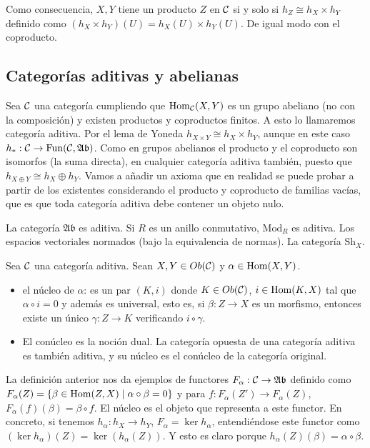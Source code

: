 \documentclass[GA.tex]{subfiles}
\begin{document}
Como consecuencia, $X,Y$ tiene un producto $Z$ en $\mathcal{C}$ si y solo si $h_Z\cong h_X\times h_Y$ definido como $(h_X\times h_Y)(U)=h_X(U)\times h_Y(U)$. De igual modo con el coproducto. 

\subsection{Categorías aditivas y abelianas}
Sea $\mathcal{C}$ una categoría cumpliendo que $\operatorname{Hom}_{\mathcal{C}}(X,Y)$ es un grupo abeliano (no con la composición) y existen productos y coproductos finitos. A esto lo llamaremos categoría aditiva. Por el lema de Yoneda $h_{X\times Y}\cong h_X\times h_Y$, aunque en este caso $h_*:\mathcal{C}\to\mathrm{Fun}(\mathcal{C}, \mathfrak{Ab})$. Como en grupos abelianos el producto y el coproducto son isomorfos (la suma directa), en cualquier categoría aditiva también, puesto que $h_{X\oplus Y}\cong h_X\oplus h_Y$. Vamos a añadir un axioma que en realidad se puede probar a partir de los existentes considerando el producto y coproducto de familias vacías, que es que toda categoría aditiva debe contener un objeto nulo. 

\begin{ej}
La categoría $\mathfrak{Ab}$ es aditiva. Si $R$ es un anillo conmutativo, $\mathrm{Mod}_R$ es aditiva. Los espacios vectoriales normados (bajo la equivalencia de normas). La categoría $\mathrm{Sh}_X$.
\end{ej}

\begin{defi}
Sea $\mathcal{C}$ una categoría aditiva. Sean $X,Y\in Ob(\mathcal{C})$ y $\alpha\in\operatorname{Hom}(X,Y)$.
\begin{itemize}
\item el núcleo de $\alpha$: es un par $(K,i)$ donde $K\in Ob(\mathcal{C})$, $i\in\operatorname{Hom}(K,X)$ tal que $\alpha\circ i=0$ y además es universal, esto es, si $\beta:Z\to X$ es un morfismo, entonces existe un único $\gamma :Z\to K$ verificando $i\circ\gamma$. 

\item El conúcleo es la noción dual. La categoría opuesta de una categoría aditiva es también aditiva, y su núcleo es el conúcleo de la categoría original. 
\end{itemize}
\end{defi}

\begin{ej}
La definición anterior nos da ejemplos de functores $F_{\alpha}:\mathcal{C}\to\mathfrak{Ab}$ definido como $F_{\alpha}(Z)=\{\beta\in\operatorname{Hom}(Z,X)\mid \alpha\circ\beta=0\}$ y para $f:F_{\alpha}(Z')\to F_{\alpha}(Z)$, $F_{\alpha}(f)(\beta)=\beta\circ f$. El núcleo es el objeto que representa a este functor. En concreto, si tenemos $h_{\alpha}:h_X\to h_Y$, $F_{\alpha}=\ker h_{\alpha}$, entendiéndose este functor como $(\ker h_{\alpha})(Z)=\ker(h_{\alpha}(Z))$. Y esto es claro porque $h_{\alpha}(Z)(\beta)=\alpha\circ\beta$. 


\end{ej}
\end{document}
